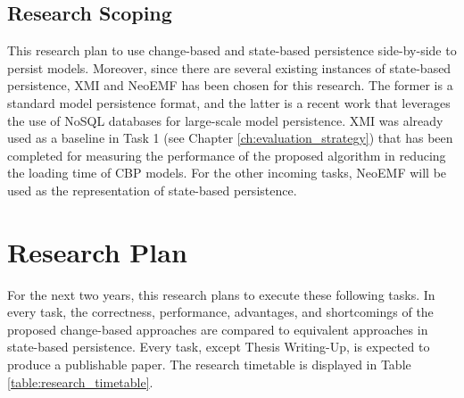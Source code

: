 \documentclass[12pt, a4paper]{report} \usepackage[titletoc]{appendix}
\begin{document}
\section{Research Scoping}
\label{sec:research_scoping}
This research plan to use change-based and state-based persistence side-by-side to persist models. Moreover, since there are several existing instances of state-based persistence, XMI and NeoEMF \cite{daniel2016neoemf} has been chosen for this research. The former is a standard model persistence format, and the latter is a recent work that leverages the use of NoSQL databases for large-scale model persistence. XMI was already used as a baseline in Task 1 (see Chapter \ref{ch:evaluation_strategy}) that has been completed for measuring the performance of the proposed algorithm in reducing the loading time of CBP models. For the other incoming tasks, NeoEMF will be used as the representation of state-based persistence.

\chapter{Research Plan}
\label{ch:research_plan}
For the next two years, this research plans to execute these following tasks. In every task, the correctness, performance, advantages, and shortcomings of the proposed change-based approaches are compared to equivalent approaches in state-based persistence. Every task, except Thesis Writing-Up, is expected to produce a publishable paper. The research timetable is displayed in Table \ref{table:research_timetable}.
\end{document}

